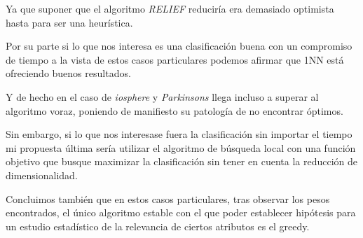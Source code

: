 Ya que suponer que el algoritmo \textit{RELIEF} reduciría era demasiado optimista hasta para ser una heurística.

Por su parte si lo que nos interesa es una clasificación buena con un compromiso de tiempo a la vista de estos casos particulares podemos afirmar que 1NN está ofreciendo buenos resultados. 

Y de hecho en el caso de \textit{iosphere} y \textit{Parkinsons} llega incluso a superar al algoritmo voraz, poniendo de manifiesto su patología de no encontrar óptimos. 

Sin embargo, si lo que nos interesase fuera la clasificación sin importar el tiempo
mi propuesta última sería utilizar el algoritmo de búsqueda local con una función objetivo que busque maximizar la clasificación sin tener en cuenta la reducción de dimensionalidad.

Concluimos también que en estos casos particulares, tras observar los pesos encontrados, el único algoritmo estable con el que poder establecer hipótesis para un estudio estadístico de la relevancia de ciertos atributos es el greedy.


